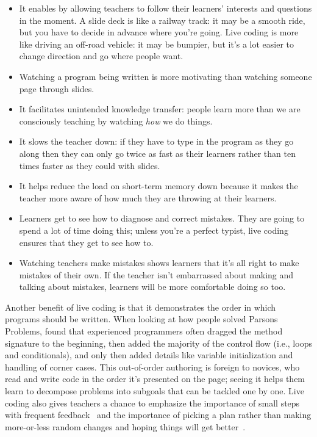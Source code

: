 \begin{itemize}

\item
  It enables 
  by allowing teachers to follow their learners' interests and questions in the moment.
  A slide deck is like a railway track:
  it may be a smooth ride,
  but you have to decide in advance where you're going.
  Live coding is more like driving an off-road vehicle:
  it may be bumpier,
  but it's a lot easier to change direction and go where people want.

\item
  Watching a program being written is more motivating
  than watching someone page through slides.

\item
  It facilitates unintended knowledge transfer:
  people learn more than we are consciously teaching
  by watching \emph{how} we do things.

\item
  It slows the teacher down:
  if they have to type in the program as they go along
  then they can only go twice as fast as their learners
  rather than ten times faster as they could with slides.

\item
  It helps reduce the load on short-term memory down
  because it makes the teacher more aware of how much they are throwing at their learners.

\item
  Learners get to see how to diagnose and correct mistakes.
  They are going to spend a lot of time doing this;
  unless you're a perfect typist,
  live coding ensures that they get to see how to.

\item
  Watching teachers make mistakes shows learners that
  it's all right to make mistakes of their own.
  If the teacher isn't embarrassed about making and talking about mistakes,
  learners will be more comfortable doing so too.

\end{itemize}

Another benefit of live coding is that it demonstrates the order in which programs should be written.
When looking at how people solved Parsons Problems,
\cite{Ihan2011} found that experienced programmers often dragged the method signature to the beginning,
then added the majority of the control flow (i.e., loops and conditionals),
and only then added details like variable initialization and handling of corner cases.
This out-of-order authoring is foreign to novices,
who read and write code in the order it's presented on the page;
seeing it helps them learn to decompose problems into subgoals that can be tackled one by one.
Live coding also gives teachers a chance to emphasize the importance of small steps with frequent feedback~\cite{Blik2014}
and the importance of picking a plan
rather than making more-or-less random changes and hoping things will get better~\cite{Spoh1985}.

